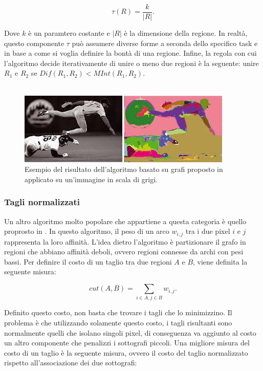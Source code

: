 \begin{equation}
    \tau(R) = \frac{k}{|R|}.
\end{equation}

Dove $k$ è un paramtero costante e $|R|$ è la dimensione della regione. In realtà, questo componente $\tau$ può assumere diverse forme a seconda dello specifico task e in base a come si voglia definire la bontà di una regione.
Infine, la regola con cui l'algoritmo decide iterativamente di unire o meno due regioni è la seguente: unire $R_{1}$ e $R_{2}$ se $Dif(R_{1}, R_{2})<MInt(R_{1}, R_{2})$.
\\ \\
\begin{figure}[h!]
    \centering
    \hspace*{-0in}
    \includegraphics[scale=1]{img/graph_segm.jpeg}
    \caption{Esempio del risultato dell'algoritmo basato su grafi proposto in \cite{graph_segm} applicato su un'immagine in scala di grigi.}
    \label{fig:graph_baseball}
\end{figure}




\subsubsection{Tagli normalizzati}
Un altro algoritmo molto popolare che appartiene a questa categoria è quello proprosto in \cite{shi2000normalized}. In questo algoritmo, il peso di un arco $w_{i,j}$ tra i due pixel $i$ e $j$ rappresenta la loro affinità. L'idea dietro l'algoritmo è partizionare il grafo in regioni che abbiano affinità deboli, ovvero regioni connesse da archi con pesi bassi. Per definire il costo di un taglio tra due regioni $A$ e $B$, viene definita la seguente misura:

\begin{equation}
    cut(A, B) = \sum_{i \in A, j \in B}{w_{i,j}}.
\end{equation}

Definito questo costo, non basta che trovare i tagli che lo minimizzino. Il problema è che utilizzando solamente questo costo, i tagli risultanti sono normalmente quelli che isolano singoli pixel, di conseguenza va aggiunto al costo un altro componente che penalizzi i sottografi piccoli.
Una migliore misura del costo di un taglio è la seguente misura, ovvero il costo del taglio normalizzato rispetto all'associazione dei due sottografi:

